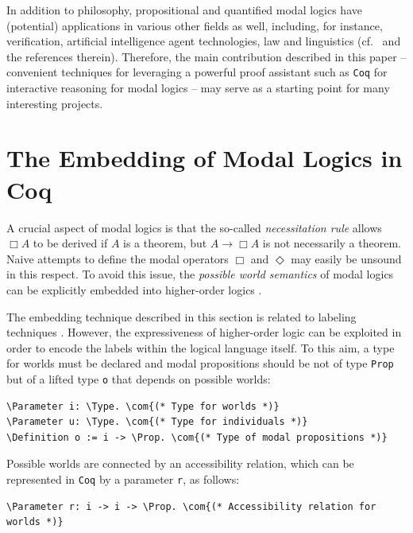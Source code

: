 \documentclass{llncs}
\newcommand{\imp}{\rightarrow}
\newcommand{\red}[1]{\textcolor[rgb]{1,0,0}{#1}}
\newcommand{\blue}[1]{\textcolor[rgb]{0,0,1}{#1}}
\newcommand{\brown}[1]{\textcolor[rgb]{0.8,0.6,0.4}{#1}}
\newcommand{\Parameter}{\red{Parameter}}
\newcommand{\Definition}{\red{Definition}}
\newcommand{\Prop}{\blue{Prop}}
\newcommand{\Type}{\blue{Type}}
\newcommand{\com}[1]{\brown{#1}}
\newcommand{\Coq}{\texttt{Coq}\xspace}
\begin{document}
In addition to philosophy, propositional and quantified modal logics 
have (potential) applications in various other fields as well, including, for instance, 
verification, artificial intelligence
agent technologies, law and linguistics (cf.~\cite{ModalLogic} and the references therein).
Therefore, the main contribution described in this paper -- convenient techniques for leveraging a powerful proof assistant such as \Coq for interactive reasoning for modal logics -- may serve as a starting point for
many interesting projects.


\section{The Embedding of Modal Logics in Coq}
\label{sec:Embedding}

A crucial aspect of modal logics \cite{ModalLogic} is that the 
so-called \emph{necessitation rule} allows $\Box A$ to be derived if $A$
is a theorem, but $A \imp \Box A$ is not necessarily a theorem. Naive
attempts to define the modal operators $\Box$ and $\Diamond$ may
easily be unsound in this respect. To avoid this issue, the
\emph{possible world semantics} of modal logics can be explicitly
embedded into higher-order logics \cite{J23,B9}.

The embedding technique described in this section is 
related to labeling techniques \cite{Labels}.
However, the expressiveness of higher-order logic can be exploited in order to
encode the labels within the logical language itself. To this aim, a type for
worlds must be declared and modal propositions should be not of type
\texttt{Prop} but of a lifted type \texttt{o} that depends on possible
worlds:

\newcommand{\verbsize}{\small}

\begin{small}
\begin{Verbatim}[commandchars=\\\{\},fontsize=\verbsize]
\Parameter i: \Type. \com{(* Type for worlds *)}
\Parameter u: \Type. \com{(* Type for individuals *)}
\Definition o := i -> \Prop. \com{(* Type of modal propositions *)}
\end{Verbatim}
\end{small}

\noindent
Possible worlds are connected by an accessibility relation, 
which can be represented in \Coq by a parameter \texttt{r}, as follows:

\begin{small}
\begin{Verbatim}[commandchars=\\\{\},fontsize=\verbsize]
\Parameter r: i -> i -> \Prop. \com{(* Accessibility relation for worlds *)}
\end{Verbatim}
\end{small}
\end{document}
